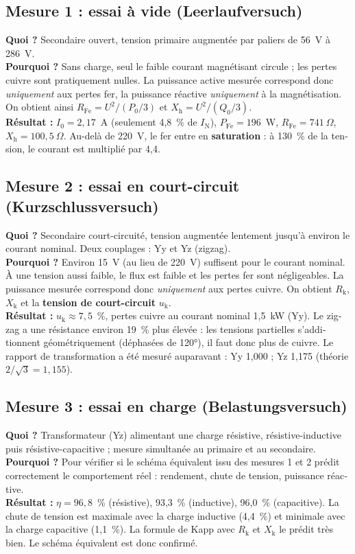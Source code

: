\documentclass[a4paper,11pt]{article}
\begin{document}
\begin{french}
\subsection{Mesure 1 : essai à vide (Leerlaufversuch)}
\textbf{Quoi ?} Secondaire ouvert, tension primaire augmentée par paliers de 56~V à 286~V.\\
\textbf{Pourquoi ?} Sans charge, seul le faible courant magnétisant circule ; les pertes cuivre sont pratiquement nulles. La puissance active mesurée correspond donc \emph{uniquement} aux pertes fer, la puissance réactive \emph{uniquement} à la magnétisation. On obtient ainsi $R_\mathrm{Fe}=U^2/(P_0/3)$ et $X_\mathrm{h}=U^2/(Q_0/3)$.\\
\textbf{Résultat :} $I_0=2{,}17$~A (seulement 4,8~\% de $I_\mathrm{N}$), $P_\mathrm{Fe}=196$~W, $R_\mathrm{Fe}=741~\Omega$, $X_\mathrm{h}=100{,}5~\Omega$. Au-delà de 220~V, le fer entre en \textbf{saturation} : à 130~\% de la tension, le courant est multiplié par 4,4.

\subsection{Mesure 2 : essai en court-circuit (Kurzschlussversuch)}
\textbf{Quoi ?} Secondaire court-circuité, tension augmentée lentement jusqu'à environ le courant nominal. Deux couplages : Yy et Yz (zigzag).\\
\textbf{Pourquoi ?} Environ 15~V (au lieu de 220~V) suffisent pour le courant nominal. À une tension aussi faible, le flux est faible et les pertes fer sont négligeables. La puissance mesurée correspond donc \emph{uniquement} aux pertes cuivre. On obtient $R_\mathrm{k}$, $X_\mathrm{k}$ et la \textbf{tension de court-circuit} $u_\mathrm{k}$.\\
\textbf{Résultat :} $u_\mathrm{k}\approx7{,}5$~\%, pertes cuivre au courant nominal 1,5~kW (Yy). Le zigzag a une résistance environ 19~\% plus élevée : les tensions partielles s'additionnent géométriquement (déphasées de 120°), il faut donc plus de cuivre. Le rapport de transformation a été mesuré auparavant : Yy 1,000 ; Yz 1,175 (théorie $2/\sqrt3=1{,}155$).

\subsection{Mesure 3 : essai en charge (Belastungsversuch)}
\textbf{Quoi ?} Transformateur (Yz) alimentant une charge résistive, résistive-inductive puis résistive-capacitive ; mesure simultanée au primaire et au secondaire.\\
\textbf{Pourquoi ?} Pour vérifier si le schéma équivalent issu des mesures 1 et 2 prédit correctement le comportement réel : rendement, chute de tension, puissance réactive.\\
\textbf{Résultat :} $\eta = 96{,}8$~\% (résistive), 93,3~\% (inductive), 96,0~\% (capacitive). La chute de tension est maximale avec la charge inductive (4,4~\%) et minimale avec la charge capacitive (1,1~\%). La formule de Kapp avec $R_\mathrm{k}$ et $X_\mathrm{k}$ le prédit très bien. Le schéma équivalent est donc confirmé.


\end{french}
\end{document}
